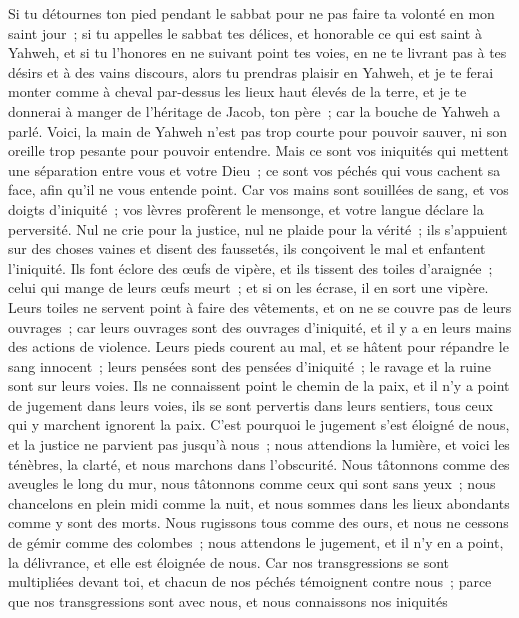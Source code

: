 \begin{multicols}{2}
Si tu détournes ton pied pendant le sabbat pour ne pas faire ta volonté en mon saint jour~; si tu appelles le sabbat tes délices, et honorable ce qui est saint à Yahweh, et si tu l'honores en ne suivant point tes voies, en ne te livrant pas à tes désirs et à des vains discours,
alors tu prendras plaisir en Yahweh, et je te ferai monter comme à cheval par-dessus les lieux haut élevés de la terre, et je te donnerai à manger de l'héritage de Jacob, ton père~; car la bouche de Yahweh a parlé.
\VerseOne{}Voici, la main de Yahweh n'est pas trop courte pour pouvoir sauver, ni son oreille trop pesante pour pouvoir entendre.
Mais ce sont vos iniquités qui mettent une séparation entre vous et votre Dieu~; ce sont vos péchés qui vous cachent sa face, afin qu'il ne vous entende point.
Car vos mains sont souillées de sang, et vos doigts d'iniquité~; vos lèvres profèrent le mensonge, et votre langue déclare la perversité.
Nul ne crie pour la justice, nul ne plaide pour la vérité~; ils s'appuient sur des choses vaines et disent des faussetés, ils conçoivent le mal et enfantent l'iniquité.
Ils font éclore des œufs de vipère, et ils tissent des toiles d'araignée~; celui qui mange de leurs œufs meurt~; et si on les écrase, il en sort une vipère.
Leurs toiles ne servent point à faire des vêtements, et on ne se couvre pas de leurs ouvrages~; car leurs ouvrages sont des ouvrages d'iniquité, et il y a en leurs mains des actions de violence.
Leurs pieds courent au mal, et se hâtent pour répandre le sang innocent~; leurs pensées sont des pensées d'iniquité~; le ravage et la ruine sont sur leurs voies.
Ils ne connaissent point le chemin de la paix, et il n'y a point de jugement dans leurs voies, ils se sont pervertis dans leurs sentiers, tous ceux qui y marchent ignorent la paix.
C'est pourquoi le jugement s'est éloigné de nous, et la justice ne parvient pas jusqu'à nous~; nous attendions la lumière, et voici les ténèbres, la clarté, et nous marchons dans l'obscurité.
Nous tâtonnons comme des aveugles le long du mur, nous tâtonnons comme ceux qui sont sans yeux~; nous chancelons en plein midi comme la nuit, et nous sommes dans les lieux abondants comme y sont des morts.
Nous rugissons tous comme des ours, et nous ne cessons de gémir comme des colombes~; nous attendons le jugement, et il n'y en a point, la délivrance, et elle est éloignée de nous.
Car nos transgressions se sont multipliées devant toi, et chacun de nos péchés témoignent contre nous~; parce que nos transgressions sont avec nous, et nous connaissons nos iniquités

\end{multicols}
